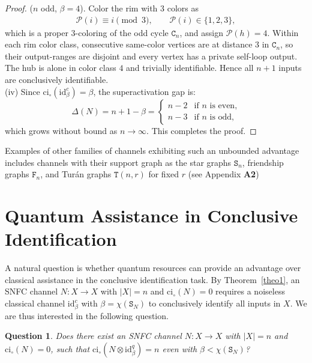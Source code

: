 \documentclass[12pt,a4paper]{article}
\newtheorem{question}{Question}
\begin{document}
\begin{proof}
 ($n$ odd, $\beta = 4$). Color the rim with $3$ colors as 
\begin{align*}
\mathcal{P}(i) \equiv 
i \pmod{3},\qquad\mathcal{P}(i) \in \{1, 2, 3\}, 
\end{align*}
which is a proper $3$-coloring of the odd cycle $\mathtt{C}_n$, and assign $\mathcal{P}(h) = 4$. Within each rim color class, consecutive same-color vertices are at distance $3$ in $\mathtt{C}_n$, so their output-ranges are disjoint and every vertex has a private self-loop output. The hub is alone in color class $4$ and trivially identifiable. Hence all $n+1$ inputs are conclusively identifiable.\\

\noindent (iv) Since $\mathrm{ci}_\circ(\mathrm{id}^c_\beta) = \beta$, 
the superactivation gap is:
\begin{equation*}
\Delta(N)=n + 1 - \beta = 
\begin{cases} 
n - 2 & \text{if } n \text{ is even,} \\ 
n - 3 & \text{if } n \text{ is odd,}
\end{cases}
\end{equation*}
which grows without bound as $n \to \infty$. This completes the proof. 
\end{proof}

\noindent Examples of other families of channels exhibiting such an unbounded advantage includes channels with their support graph as the star graphs $\mathtt{S}_n$, friendship graphs $\mathtt{F}_n$, and Turán graphs $\mathtt{T}(n,r)$ for fixed $r$ {(see Appendix {\bf A2})}


\section{Quantum Assistance in Conclusive Identification}\label{sec4}

A natural question is whether quantum resources can provide an advantage over classical assistance in the conclusive identification task. By Theorem~\ref{theo1}, an SNFC channel $N : X \to X$ with $|X| = n$ and $\mathrm{ci}_\circ(N) = 0$ requires a noiseless classical channel $\mathrm{id}^c_\beta$ with $\beta = \chi(\mathtt{S}_N)$ to conclusively identify all inputs in $X$. We are thus interested in the following question. 

\begin{question}\label{qu3}
Does there exist an SNFC channel $N : X \to X$ with $|X| = n$ and $\mathrm{ci}_\circ(N) = 0$, such that $\mathrm{ci}_\circ(N \otimes \mathrm{id}^q_{\beta})= n$ even with $\beta<\chi(\mathtt{S}_N)$?
\end{question}
\end{document}
